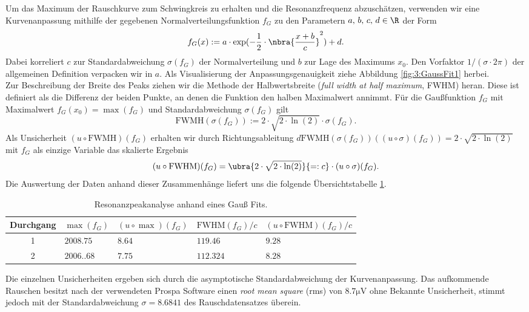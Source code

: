 \documentclass{article}
\begin{document}
    Um das Maximum der Rauschkurve zum Schwingkreis zu erhalten und die Resonanzfrequenz abzuschätzen, verwenden wir eine Kurvenanpassung mithilfe der gegebenen Normalverteilungsfunktion $f_G$ zu den Parametern $a,\, b,\, c,\, d\in\R$ der Form
    \[
        f_G(x) := a\cdot\exp(-\frac{1}{2}\cdot\nbra{\frac{x + b}{c}}^2) + d.
    \]
    Dabei korreliert $c$ zur Standardabweichung $\sigma(f_G)$ der Normalverteilung und $b$ zur Lage des Maximums $x_0$. Den Vorfaktor $1/(\sigma\cdot 2\pi)$ der allgemeinen Definition verpacken wir in $a$. Als Visualisierung der Anpassungsgenauigkeit ziehe Abbildung \ref{fig:3:GaussFit1} herbei. \\
    Zur Beschreibung der Breite des Peaks ziehen wir die Methode der Halbwertsbreite (\emph{full width at half maximum}, FWHM) heran. Diese ist definiert als die Differenz der beiden Punkte, an denen die Funktion den halben Maximalwert annimmt. Für die Gaußfunktion $f_G$ mit Maximalwert $f_G(x_0) = \max(f_G)$ und Standardabweichung $\sigma(f_G)$ gilt
    \[
        \text{FWMH}(\sigma(f_G)) := 2\cdot\sqrt{2\cdot\ln(2)}\cdot\sigma(f_G).
    \]
    Als Unsicherheit $(u\circ\text{FWMH})(f_G)$ erhalten wir durch Richtungsableitung $d\text{FWMH}(\sigma(f_G))((u\circ\sigma)(f_G)) = 2\cdot\sqrt{2\cdot\ln(2)}$ mit $f_G$ als einzige Variable das skalierte Ergebnis \cite[wiki]{enwiki:FWHM}
    \[
        (u\circ\text{FWHM})(f_G) = \ubra{2\cdot\sqrt{2\cdot\ln(2)}}{=:c}\cdot (u\circ\sigma)(f_G).
    \] 
    Die Auswertung der Daten anhand dieser Zusammenhänge liefert uns die folgende Übersichtstabelle \ref{tab:3:PeakInfo}.
    \begin{table}[H]
       \centering
       \begin{tabular}{c|ll|ll}
            \textbf{Durchgang} & $\max(f_G)$ & $(u\circ\max)(f_G)$ & $\text{FWHM}(f_G)/c$ & $(u\circ\text{FWHM})(f_G)/c$ \\
            \hline
            1 & $2008.75$ & $8.64$ & $119.46$ & $9.28$ \\
            2 & $2006..68$ & $7.75$ & $112.324$ & $8.28$
        \end{tabular} 
        \caption{Resonanzpeakanalyse anhand eines Gauß Fits.}
        \label{tab:3:PeakInfo}
    \end{table}
    Die einzelnen Unsicherheiten ergeben sich durch die asymptotische Standardabweichung der Kurvenanpassung. Das aufkommende Rauschen besitzt nach der verwendeten Prospa Software einen \emph{root mean square} (rms) von $8.7\si{\micro\volt}$ ohne Bekannte Unsicherheit, stimmt jedoch mit der Standardabweichung $\sigma = 8.6841$ des Rauschdatensatzes überein. \\
\end{document}
